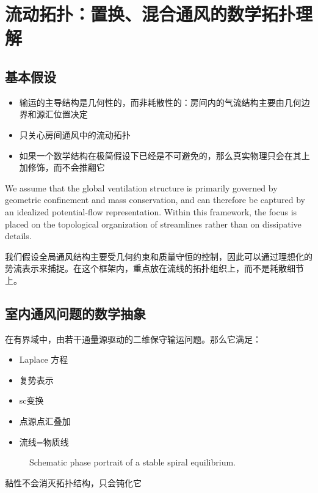 
\section{流动拓扑：置换、混合通风的数学拓扑理解}

\subsection{基本假设}
\begin{itemize}
    \item 输运的主导结构是几何性的，而非耗散性的：房间内的气流结构主要由几何边界和源汇位置决定
    \item 只关心房间通风中的流动拓扑
    \item 如果一个数学结构在极简假设下已经是不可避免的，那么真实物理只会在其上加修饰，而不会推翻它
\end{itemize}
We assume that the global ventilation structure is primarily governed by geometric confinement and mass conservation, and can therefore be captured by an idealized potential-flow representation. Within this framework, the focus is placed on the topological organization of streamlines rather than on dissipative details.

我们假设全局通风结构主要受几何约束和质量守恒的控制，因此可以通过理想化的势流表示来捕捉。在这个框架内，重点放在流线的拓扑组织上，而不是耗散细节上。

\subsection{室内通风问题的数学抽象}
在有界域中，由若干通量源驱动的二维保守输运问题。那么它满足：
\begin{itemize}
    \item Laplace 方程
    \item 复势表示
    \item sc变换
    \item 点源点汇叠加
    \item 流线=物质线
\end{itemize}

\begin{figure}
\centering
{}
\caption{Schematic phase portrait of a stable spiral equilibrium.}
\label{fig:local_phase_portrait}
\end{figure}


黏性不会消灭拓扑结构，只会钝化它

